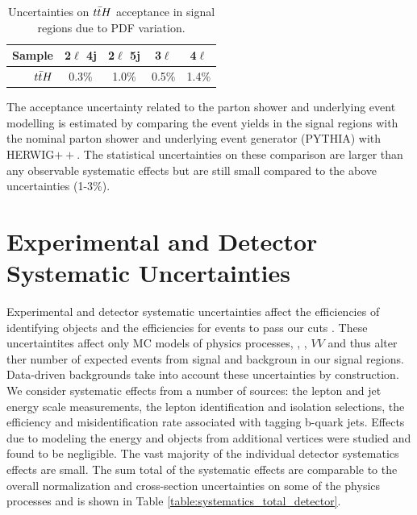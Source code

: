 \begin{table}
\begin{center}
\caption{\label{table:systematics_pdfaccttH}Uncertainties on $t\bar{t} H$ acceptance in signal
  regions due to PDF variation.}
\begin{tabular}{r|c|c|c|c}
Sample & 2$\ell$ 4j & 2$\ell$ 5j & 3$\ell$ & 4$\ell$\\
\hline
$t\bar{t} H$ & 0.3\% & 1.0\% & 0.5\% & 1.4\%\\
\end{tabular}
\end{center}
\end{table}

The acceptance uncertainty related to the parton shower and underlying event modelling is estimated by comparing the event yields in the signal regions with the nominal
parton shower and underlying event generator ({\textsc PYTHIA}) with {\textsc HERWIG$++$}. The statistical uncertainties on these comparison are larger than any observable
systematic effects but are still small compared to the above uncertainties (1-3\%). 


\section{Experimental and Detector Systematic Uncertainties}
 
Experimental and detector systematic uncertainties affect the efficiencies of identifying objects and the efficiencies for events to pass our cuts . These uncertaintites affect only MC models of physics processes, \ttV, \tth, $VV$ and thus alter ther number of expected events from signal and backgroun in our signal regions. Data-driven backgrounds take into account these uncertainties by construction. We consider systematic effects from a number of sources: the lepton and jet energy scale measurements, the lepton identification and isolation selections, the efficiency and misidentification rate associated with tagging b-quark jets. Effects due to modeling the energy and objects from additional vertices were studied and found to be negligible. The vast majority of the individual detector systematics effects are small. The sum total of the systematic effects are comparable to the overall normalization and cross-section uncertainties on some of the physics processes and is shown in Table \ref{table:systematics_total_detector}.

